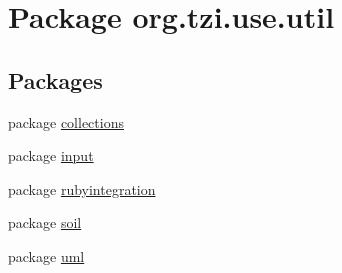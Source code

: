 \hypertarget{namespaceorg_1_1tzi_1_1use_1_1util}{\section{Package org.\-tzi.\-use.\-util}
\label{namespaceorg_1_1tzi_1_1use_1_1util}
}
\subsection*{Packages}
\begin{DoxyCompactItemize}
\item 
package \hyperlink{namespaceorg_1_1tzi_1_1use_1_1util_1_1collections}{collections}
\item 
package \hyperlink{namespaceorg_1_1tzi_1_1use_1_1util_1_1input}{input}
\item 
package \hyperlink{namespaceorg_1_1tzi_1_1use_1_1util_1_1rubyintegration}{rubyintegration}
\item 
package \hyperlink{namespaceorg_1_1tzi_1_1use_1_1util_1_1soil}{soil}
\item 
package \hyperlink{namespaceorg_1_1tzi_1_1use_1_1util_1_1uml}{uml}
\end{DoxyCompactItemize}
